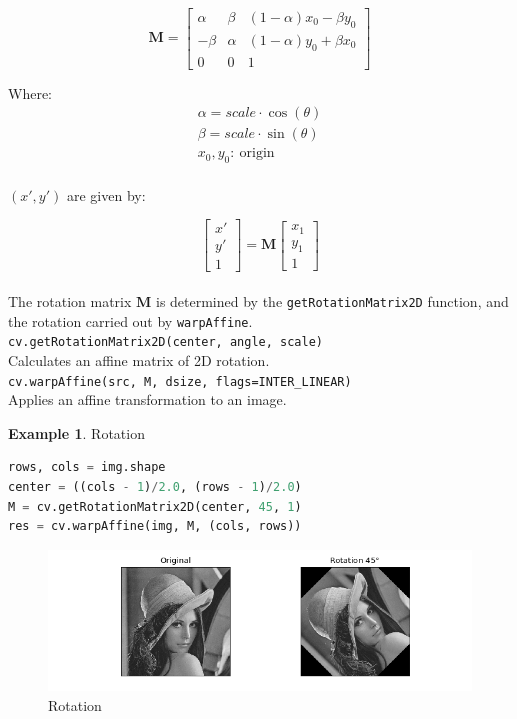 \documentclass{article}
\theoremstyle{definition}
\newtheorem{ex}{Example}[subsection]
\theoremstyle{remark}
\newcommand{\func}[2]{\noindent\lstinline{#1}\\#2}
\begin{document}
\begin{equation}
    \pmb{M} = \begin{bmatrix}
	\alpha & \beta & (1-\alpha)x_0 - \beta y_0 \\
       -\beta & \alpha & (1-\alpha)y_0 + \beta x_0 \\
	0 & 0 & 1
    \end{bmatrix} 
\end{equation} 

\noindent Where:
\begin{gather*}
    \alpha = scale \cdot \cos(\theta) \\
    \beta = scale \cdot \sin(\theta) \\
    x_0, y_0:\ \text{origin}
\end{gather*} \\

\noindent $ (x', y') $ are given by:

\begin{equation*}
    \begin{bmatrix}
	x' \\
	y' \\
	1
    \end{bmatrix} =  
    \pmb{M}
    \begin{bmatrix}
	x_1 \\
	y_1 \\
	1
    \end{bmatrix}
\end{equation*} \\

The rotation matrix $ \pmb{M} $ is determined by the \lstinline{getRotationMatrix2D} function, and the rotation carried out by \lstinline{warpAffine}.\\

\func{cv.getRotationMatrix2D(center, angle, scale)}{Calculates an affine matrix of 2D rotation.} \\

\func{cv.warpAffine(src, M, dsize, flags=INTER_LINEAR)}{Applies an affine transformation to an image. }

\begin{ex} Rotation
\begin{lstlisting}[language=Python]
rows, cols = img.shape
center = ((cols - 1)/2.0, (rows - 1)/2.0)
M = cv.getRotationMatrix2D(center, 45, 1)
res = cv.warpAffine(img, M, (cols, rows))
\end{lstlisting}

\begin{figure}[h!]
    \centering
    \includegraphics[width=\textwidth]{ocv_gt_rotation}
    \caption{Rotation}
    \label{fig:ocv_gt_rot}
\end{figure}
\end{ex}
\end{document}
